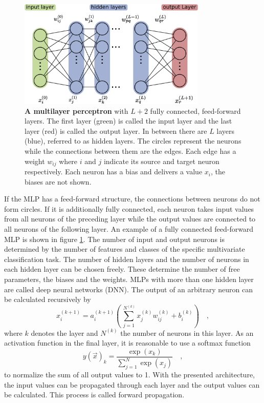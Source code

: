 \begin{figure}
\centering
\includegraphics[width=0.8\textwidth]{chapter_4_stat/ann_3.png}
\caption[Multilayer Perceptron]{\textbf{A multilayer perceptron} with $L+2$ fully connected, feed-forward layers. The first layer (green) is called the input layer and the last layer (red) is called the output layer. In between there are $L$ layers (blue), referred to as hidden layers.  The circles represent the neurons while the connections between them are the edges. Each edge has a weight $w_{ij}$ where $i$ and $j$ indicate its source and target neuron respectively. Each neuron has a bias and delivers a value $x_i$, the biases are not shown.}
\label{fig:ch_4_dnn}
\end{figure}
If the MLP has a feed-forward structure, the connections between neurons do not form circles. If it is additionally fully connected, each neuron takes input values from all neurons of the preceding layer while the output values are connected to all neurons of the following layer. An example of a fully connected feed-forward MLP is shown in figure \ref{fig:ch_4_dnn}. The number of input and output neurons is determined by the number of features and classes of the specific multivariate classification task. The number of hidden layers and the number of neurons in each hidden layer can be chosen freely. These determine the number of free parameters, the biases and the weights. MLPs with more than one hidden layer are called deep neural networks (DNN). The output of an arbitrary neuron can be calculated recursively by 
\begin{equation}
x_i^{(k+1)} = a^{(k+1)}_i \left( \sum_{j=1}^{\ N^{(k)}} x_j^{(k)} w_{ij}^{(k)} + b_{i}^{(k)} \right) \quad ,  
\end{equation}
where $k$ denotes the layer and $N^{(k)}$ the number of neurons in this layer. As an activation function in the final layer, it is reasonable to use a softmax function
\begin{equation}\label{eq:ch4_NN_softmax}
y(\vec{x})_k = \frac{\exp(x_k)}{\sum_{j=1}^N \exp(x_j)}	\quad ,
\end{equation}
to normalize the sum of all output values to 1. With the presented architecture, the input values can be propagated through each layer and the output values can be calculated. This process is called forward propagation. 


